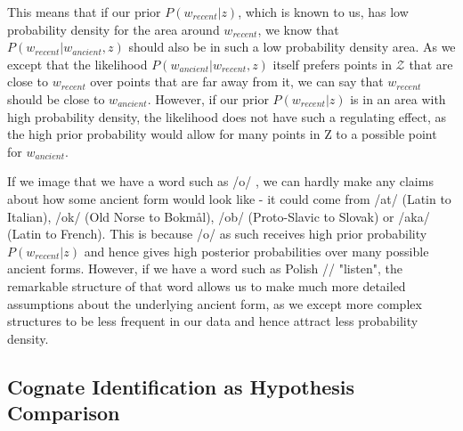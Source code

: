 \documentclass[8pt]{article}
\begin{document}
This means that if our prior $P(w_{recent}|z)$, which is known to us, has low probability density for the area around $w_{recent}$, we know that $P(w_{recent}|w_{ancient},z)$ should also be in such a low probability density area. As we except that the likelihood  $P(w_{ancient}|w_{recent},z)$ itself prefers points in $\mathcal{Z}$ that are close to $w_{recent}$ over points that are far away from it, we can say that $w_{recent}$ should be close to $w_{ancient}$. 
However, if our prior $P(w_{recent}|z)$ is in an area with high probability density, the likelihood does not have such a regulating effect, as the high prior probability would allow for many points in Z to a possible point for $w_{ancient}$. 

If we image that we have a word such as  /o/ , we can hardly make any claims about how some ancient form would look like - it could come from /at/ (Latin to Italian), /ok/ (Old Norse to Bokm\r{a}l), /ob/ (Proto-Slavic to Slovak) or /aka/ (Latin to French). This is because /o/ as such receives high prior probability $P(w_{recent}|z)$ and hence gives high posterior probabilities over many possible ancient forms. However, if we have a word such as Polish // "listen", the remarkable structure of that word allows us to make much more detailed assumptions about the underlying ancient form, as we except more complex structures to be less frequent in our data and hence attract less probability density.

\subsection{Cognate Identification as Hypothesis Comparison}
\end{document}
